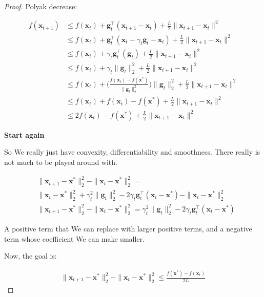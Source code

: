 \documentclass{article}
\begin{document}
\begin{proof}
	Polyak decrease:
	
	\begin{align}
		f(\mathbf{x}_{t+1}) &\le f(\mathbf{x}_t) + \mathbf{g}_t^\top(\mathbf{x}_{t+1} - \mathbf{x}_t) + \frac{L}{2}\|\mathbf{x}_{t+1} - \mathbf{x}_t\|^2\\
		&\le f(\mathbf{x}_t) + \mathbf{g}_t^\top(\mathbf{x}_{t} - \gamma_t \mathbf{g}_t - \mathbf{x}_t) + \frac{L}{2}\|\mathbf{x}_{t+1} - \mathbf{x}_t\|^2\\
	&\le f(\mathbf{x}_t) + \gamma_t\mathbf{g}_t^\top( \mathbf{g}_t) + \frac{L}{2}\|\mathbf{x}_{t+1} - \mathbf{x}_t\|^2	\\
	&\le f(\mathbf{x}_t) + \gamma_t \|\mathbf{g}_t\|^2_2 + \frac{L}{2}\|\mathbf{x}_{t+1} - \mathbf{x}_t\|^2	\\
	&\le f(\mathbf{x}_t) + \bigg( \frac{f(\mathbf{x}_t) - f(\mathbf{x}^*)}{\|\mathbf{g}_t\|^2_2} \bigg) \|\mathbf{g}_t\|^2_2 + \frac{L}{2}\|\mathbf{x}_{t+1} - \mathbf{x}_t\|^2	\\
	&\le f(\mathbf{x}_t) +f(\mathbf{x}_t) - f(\mathbf{x}^*) + \frac{L}{2}\|\mathbf{x}_{t+1} - \mathbf{x}_t\|^2	\\
	&\le 2f(\mathbf{x}_t) - f(\mathbf{x}^*) + \frac{L}{2}\|\mathbf{x}_{t+1} - \mathbf{x}_t\|^2
	\end{align}
	
	
	\textbf{Start again}
	
	So We really just have convexity, differentiability and smoothness. There really is not much to be played around with. 
	
	\begin{align}
		&\|\mathbf{x}_{t+1} - \mathbf{x}^*\|^2_2 - \|\mathbf{x}_{t} - \mathbf{x}^*\|^2_2= \\
		&\|\mathbf{x}_t  - \mathbf{x}^* \|^2_2 + \gamma_t^2\|\mathbf{g}_t\|^2_2 - 2 \gamma_t\mathbf{g}^\top_t(\mathbf{x}_t - \mathbf{x}^*) -  \|\mathbf{x}_{t} - \mathbf{x}^*\|^2_2 \\
		&\|\mathbf{x}_{t+1} - \mathbf{x}^*\|^2_2 - \|\mathbf{x}_{t} - \mathbf{x}^*\|^2_2= \gamma_t^2\|\mathbf{g}_t\|^2_2 - 2 \gamma_t\mathbf{g}^\top_t(\mathbf{x}_t - \mathbf{x}^*) 
	\end{align}
	
	A positive term that We can replace with larger positive terms, and a negative term whose coefficient We can make smaller.
	
	Now, the goal is:
	
	\begin{align}
		\|\mathbf{x}_{t+1} - \mathbf{x}^* \|^2_2 -  \| \mathbf{x}_t - \mathbf{x}^*\|^2_2 \le \frac{f(\mathbf{x}^*) - f(\mathbf{x}_t)}{2L}
	\end{align}
	

\end{proof}
\end{document}
